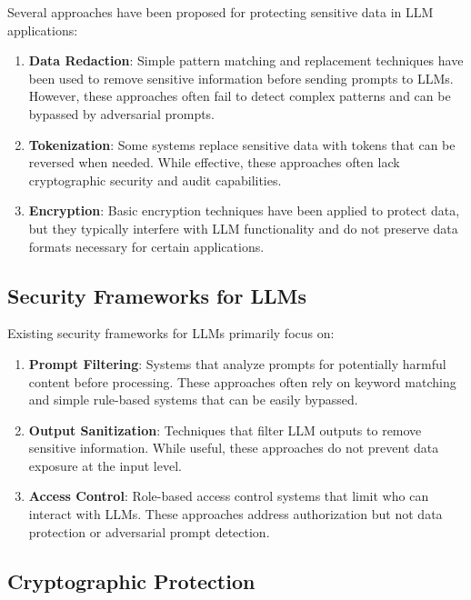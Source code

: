 \documentclass[12pt]{article}
\begin{document}
Several approaches have been proposed for protecting sensitive data in LLM applications:

\begin{enumerate}
    \item \textbf{Data Redaction}: Simple pattern matching and replacement techniques have been used to remove sensitive information before sending prompts to LLMs. However, these approaches often fail to detect complex patterns and can be bypassed by adversarial prompts.
    
    \item \textbf{Tokenization}: Some systems replace sensitive data with tokens that can be reversed when needed. While effective, these approaches often lack cryptographic security and audit capabilities.
    
    \item \textbf{Encryption}: Basic encryption techniques have been applied to protect data, but they typically interfere with LLM functionality and do not preserve data formats necessary for certain applications.
\end{enumerate}

\subsection{Security Frameworks for LLMs}

Existing security frameworks for LLMs primarily focus on:

\begin{enumerate}
    \item \textbf{Prompt Filtering}: Systems that analyze prompts for potentially harmful content before processing. These approaches often rely on keyword matching and simple rule-based systems that can be easily bypassed.
    
    \item \textbf{Output Sanitization}: Techniques that filter LLM outputs to remove sensitive information. While useful, these approaches do not prevent data exposure at the input level.
    
    \item \textbf{Access Control}: Role-based access control systems that limit who can interact with LLMs. These approaches address authorization but not data protection or adversarial prompt detection.
\end{enumerate}

\subsection{Cryptographic Protection}
\end{document}
